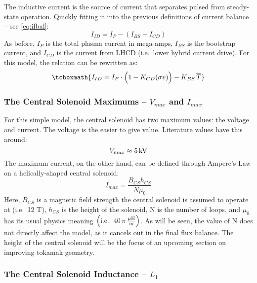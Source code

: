 The inductive current is the source of current that separates pulsed from steady-state operation. Quickly fitting it into the previous definitions of current balance -- see \cref{eq:ifbal}:
\begin{equation}
	I_{ID} = I_P - ( I_{BS} + I_{CD} )
\end{equation}
As before, $I_P$ is the total plasma current in mega-amps, $I_{BS}$ is the bootstrap current, and $I_{CD}$ is the current from LHCD (i.e.\ lower hybrid current drive). For this model, the relation can be rewritten as:
\begin{equation}
	\tcboxmath{
	I_{ID} = I_P \cdot \Big( 1 - K_{CD} ( \sigma v ) \Big) - K_{BS} \, \overline T
	}
\end{equation}

\subsubsection{The Central Solenoid Maximums -- $V_{max}$ and $I_{max}$}

For this simple model, the central solenoid has two maximum values: the voltage and current. The voltage is the easier to give value. Literature values have this around: \cite{arc}
\begin{equation}
	V_{max} \approx 5 \, \textnormal{kV}
\end{equation}
The maximum current, on the other hand, can be defined through Ampere's Law on a helically-shaped central solenoid: \cite{griffiths}
\begin{equation}
	I_{max} = \frac{B_{CS} h_{CS}}{N \mu_0}
\end{equation}
Here, $B_{CS}$ is a magnetic field strength the central solenoid is assumed to operate at (i.e.\ 12 T), $h_{CS}$ is the height of the solenoid, N is the number of loops, and $\mu_0$ has its usual physics meaning $\left( \textnormal{i.e.\ } \ 40 \, \pi \, \frac{ \mu \textnormal{H}}{\textnormal{m}} \right)$. As will be seen, the value of N does not directly affect the model, as it cancels out in the final flux balance. The height of the central solenoid will be the focus of an upcoming section on improving tokamak geometry.

\subsubsection{The Central Solenoid Inductance -- $L_1$}

